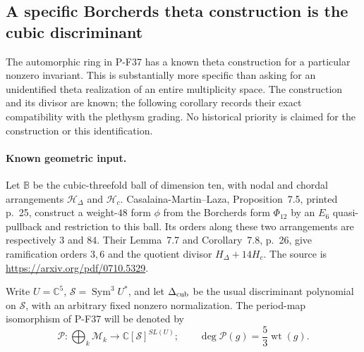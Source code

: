 \documentclass[11pt,a4paper]{article}
\begin{document}
\subsection{A specific Borcherds theta construction is the cubic discriminant}

The automorphic ring in P-F37 has a known theta construction for a
particular nonzero invariant. This is substantially more specific than
asking for an unidentified theta realization of an entire multiplicity
space. The construction and its divisor are known; the following
corollary records their exact compatibility with the plethysm grading.
No historical priority is claimed for the construction or this
identification.

\paragraph{Known geometric input.}
Let $\mathbb B$ be the cubic-threefold ball of dimension ten, with
nodal and chordal arrangements $\mathcal H_\Delta$ and $\mathcal H_c$.
Casalaina-Martin--Laza, Proposition~7.5, printed p.~25,
construct a weight-$48$ form $\phi$ from the Borcherds form
$\Phi_{12}$ by an $E_6$ quasi-pullback and restriction to this ball.
Its orders along these two arrangements are respectively $3$ and $84$.
Their Lemma~7.7 and Corollary~7.8, p.~26, give ramification
orders $3,6$ and the quotient divisor $H_\Delta+14H_c$.
The source is \url{https://arxiv.org/pdf/0710.5329}.

Write $U=\mathbb C^5$, $\mathscr S=\operatorname{Sym}^3U^*$,
and let $\Delta_{\rm cub}$ be the usual discriminant polynomial
on $\mathscr S$, with an arbitrary fixed nonzero normalization.
The period-map isomorphism of P-F37 will be denoted by
\[
 \mathcal P:\bigoplus_k\mathcal M_k
       \longrightarrow \mathbb C[\mathscr S]^{SL(U)};
 \qquad\deg\mathcal P(g)=\frac53\operatorname{wt}(g).
 \tag{P-F41a}
\]
\end{document}
